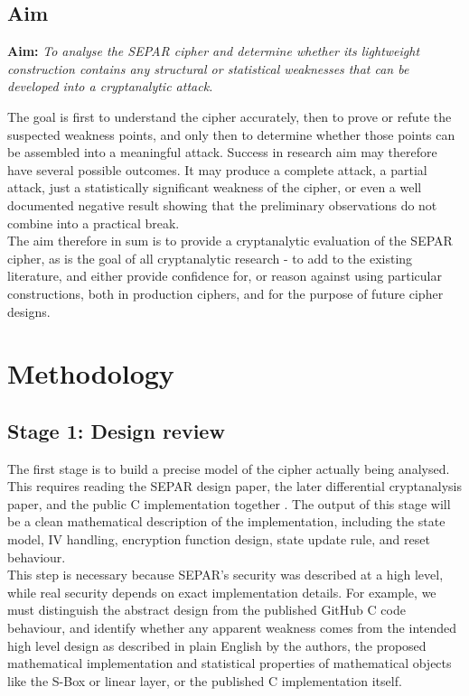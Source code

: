 \documentclass[11pt]{article}
\begin{document}
\subsection{Aim}

\textbf{Aim:} \textit{To analyse the SEPAR cipher and determine whether its lightweight construction contains any structural or statistical weaknesses that can be developed into a cryptanalytic attack.}

The goal is first to understand the cipher accurately, then to prove or refute the suspected weakness points, and only then to determine whether those points can be assembled into a meaningful attack. Success in research aim may therefore have several possible outcomes. It may produce a complete attack, a partial attack, just a statistically significant weakness of the cipher, or even a well documented negative result showing that the preliminary observations do not combine into a practical break.\\

The aim therefore in sum is to provide a cryptanalytic evaluation of the SEPAR cipher, as is the goal of all cryptanalytic research - to add to the existing literature, and either provide confidence for, or reason against using particular constructions, both in production ciphers, and for the purpose of future cipher designs.


\section{Methodology}

\subsection{Stage 1: Design review}

The first stage is to build a precise model of the cipher actually being analysed. This requires reading the SEPAR design paper, the later differential cryptanalysis paper, and the public C implementation together \cite{VahiJassbi2020,VahiMirnia2021}. The output of this stage will be a clean mathematical description of the implementation, including the state model, IV handling, encryption function design, state update rule, and reset behaviour.\\

This step is necessary because SEPAR's security was described at a high level, while real security depends on exact implementation details. For example, we must distinguish the abstract design from the published GitHub C code behaviour, and identify whether any apparent weakness comes from the intended high level design as described in plain English by the authors, the proposed mathematical implementation and statistical properties of mathematical objects like the S-Box or linear layer, or the published C implementation itself.\\
\end{document}
